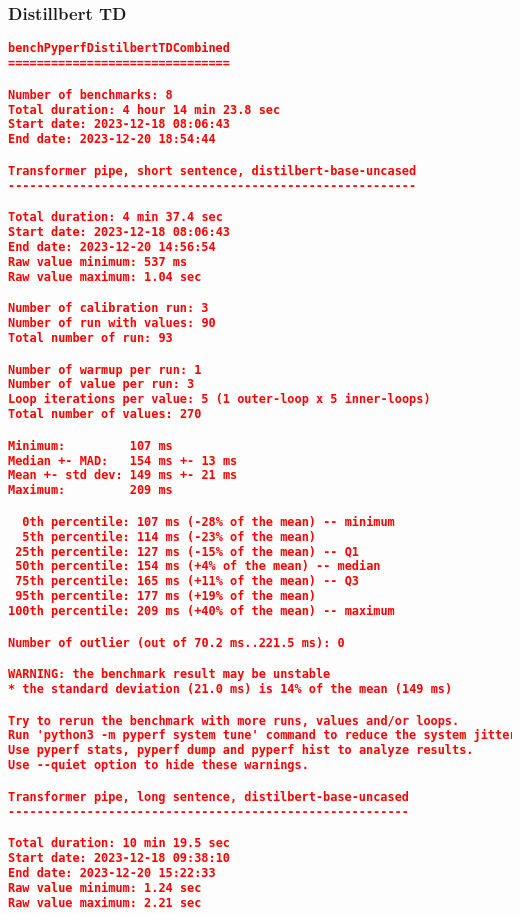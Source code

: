 \subsubsection{Distillbert TD}
\begin{lstlisting}[language=json]
    benchPyperfDistilbertTDCombined
===============================

Number of benchmarks: 8
Total duration: 4 hour 14 min 23.8 sec
Start date: 2023-12-18 08:06:43
End date: 2023-12-20 18:54:44

Transformer pipe, short sentence, distilbert-base-uncased
---------------------------------------------------------

Total duration: 4 min 37.4 sec
Start date: 2023-12-18 08:06:43
End date: 2023-12-20 14:56:54
Raw value minimum: 537 ms
Raw value maximum: 1.04 sec

Number of calibration run: 3
Number of run with values: 90
Total number of run: 93

Number of warmup per run: 1
Number of value per run: 3
Loop iterations per value: 5 (1 outer-loop x 5 inner-loops)
Total number of values: 270

Minimum:         107 ms
Median +- MAD:   154 ms +- 13 ms
Mean +- std dev: 149 ms +- 21 ms
Maximum:         209 ms

  0th percentile: 107 ms (-28% of the mean) -- minimum
  5th percentile: 114 ms (-23% of the mean)
 25th percentile: 127 ms (-15% of the mean) -- Q1
 50th percentile: 154 ms (+4% of the mean) -- median
 75th percentile: 165 ms (+11% of the mean) -- Q3
 95th percentile: 177 ms (+19% of the mean)
100th percentile: 209 ms (+40% of the mean) -- maximum

Number of outlier (out of 70.2 ms..221.5 ms): 0

WARNING: the benchmark result may be unstable
* the standard deviation (21.0 ms) is 14% of the mean (149 ms)

Try to rerun the benchmark with more runs, values and/or loops.
Run 'python3 -m pyperf system tune' command to reduce the system jitter.
Use pyperf stats, pyperf dump and pyperf hist to analyze results.
Use --quiet option to hide these warnings.

Transformer pipe, long sentence, distilbert-base-uncased
--------------------------------------------------------

Total duration: 10 min 19.5 sec
Start date: 2023-12-18 09:38:10
End date: 2023-12-20 15:22:33
Raw value minimum: 1.24 sec
Raw value maximum: 2.21 sec


\end{lstlisting}
